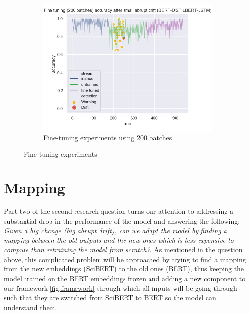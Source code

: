 \documentclass[12pt]{extreport}
\begin{document}
\begin{figure}[H]
\begin{subfigure}{.55\textwidth}
\centering
\includegraphics[width=\linewidth]{assets/addressing-change/fine_tuning_lstm_wos_1_BERT_DISTILBERT_200_batches.png}
\caption{Fine-tuning experiments using 200 batches}
\label{fig:fine200}
\end{subfigure}
\caption{Fine-tuning experiments}
\label{fig:fine}
\end{figure}

\cleardoublepage
\section{Mapping} \label{sec:map}

Part two of the second research question turns our attention to addressing a substantial drop in the performance of the model and answering the following: \emph{Given a big change (big abrupt drift), can we adapt the model by finding a mapping between the old outputs and the new ones which is less expensive to compute than retraining the model from scratch?}. As mentioned in the question above, this complicated problem will be approached by trying to find a mapping from the new embeddings (SciBERT) to the old ones (BERT), thus keeping the model trained on the BERT embeddings frozen and adding a new component to our framework \ref{fig:framework} through which all inputs will be going through such that they are switched from SciBERT to BERT so the model can understand them.
\end{document}
